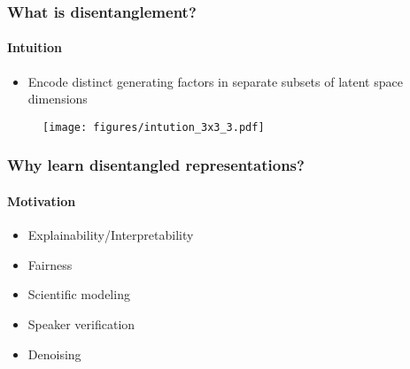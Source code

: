 \documentclass[9pt]{beamer}
\begin{document}
\begin{frame}
\frametitle{What is disentanglement?}
\framesubtitle{Intuition}
\begin{itemize}%
	\item Encode distinct generating factors in separate subsets of latent space dimensions
\end{itemize}
\begin{figure}
	\texttt{[image: figures/intution\_3x3\_3.pdf]}
\end{figure}
\end{frame} 





\begin{frame}
\frametitle{Why learn disentangled representations?}
\framesubtitle{Motivation}
\begin{itemize}%
	\item Explainability/Interpretability
	\item Fairness
	\item Scientific modeling %
	\item Speaker verification %
	\item Denoising
\end{itemize}
\end{frame} 
\end{document}
